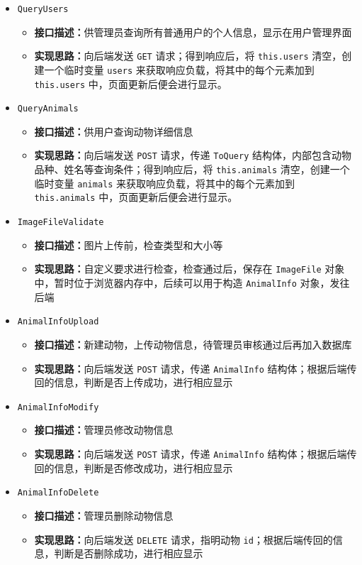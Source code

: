 \documentclass[12pt,a4paper,UTF8]{article}
\begin{document}
\begin{itemize}
  \item \verb|QueryUsers|
  \begin{itemize}
  \item \textbf{接口描述：}供管理员查询所有普通用户的个人信息，显示在用户管理界面
  \item \textbf{实现思路：}向后端发送 \verb|GET| 请求；得到响应后，将 \verb|this.users| 清空，创建一个临时变量 \verb|users| 来获取响应负载，将其中的每个元素加到 \verb|this.users| 中，页面更新后便会进行显示。
  \end{itemize}

  \item \verb|QueryAnimals|
  \begin{itemize}
  \item \textbf{接口描述：}供用户查询动物详细信息
  \item \textbf{实现思路：}向后端发送 \verb|POST| 请求，传递 \verb|ToQuery| 结构体，内部包含动物品种、姓名等查询条件；得到响应后，将 \verb|this.animals| 清空，创建一个临时变量 \verb|animals| 来获取响应负载，将其中的每个元素加到 \verb|this.animals| 中，页面更新后便会进行显示。
  \end{itemize}

  \item \verb|ImageFileValidate|
  \begin{itemize}
  \item \textbf{接口描述：}图片上传前，检查类型和大小等
  \item \textbf{实现思路：}自定义要求进行检查，检查通过后，保存在 \verb|ImageFile| 对象中，暂时位于浏览器内存中，后续可以用于构造 \verb|AnimalInfo| 对象，发往后端
  \end{itemize}

  \item \verb|AnimalInfoUpload|
  \begin{itemize}
  \item \textbf{接口描述：}新建动物，上传动物信息，待管理员审核通过后再加入数据库
  \item \textbf{实现思路：}向后端发送 \verb|POST| 请求，传递 \verb|AnimalInfo| 结构体；根据后端传回的信息，判断是否上传成功，进行相应显示
  \end{itemize}

  \item \verb|AnimalInfoModify|
  \begin{itemize}
  \item \textbf{接口描述：}管理员修改动物信息
  \item \textbf{实现思路：}向后端发送 \verb|POST| 请求，传递 \verb|AnimalInfo| 结构体；根据后端传回的信息，判断是否修改成功，进行相应显示
  \end{itemize}

  \item \verb|AnimalInfoDelete|
  \begin{itemize}
  \item \textbf{接口描述：}管理员删除动物信息
  \item \textbf{实现思路：}向后端发送 \verb|DELETE| 请求，指明动物 \verb|id|；根据后端传回的信息，判断是否删除成功，进行相应显示
  \end{itemize}

\end{itemize}
\end{document}

